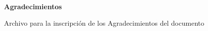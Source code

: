 \begin{center}

    \textbf{Agradecimientos}\par
    
\end{center}

Archivo para la inscripción de los Agradecimientos del documento